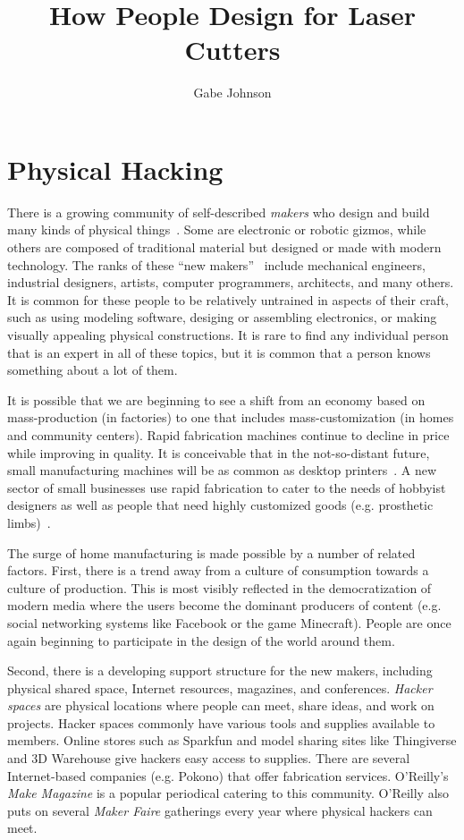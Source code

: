 \documentclass[12pt]{article}
\title{How People Design for Laser Cutters}
\author{Gabe Johnson}
\begin{document}
\maketitle

\section{Physical Hacking}

There is a growing community of self-described \textit{makers} who
design and build many kinds of physical
things~\cite{gershenfeld-fab}. Some are electronic or robotic gizmos,
while others are composed of traditional material but designed or made
with modern technology. The ranks of these ``new
makers''~\cite{gross-new-makers} include mechanical engineers,
industrial designers, artists, computer programmers, architects, and
many others. It is common for these people to be relatively untrained
in aspects of their craft, such as using modeling software, desiging
or assembling electronics, or making visually appealing physical
constructions. It is rare to find any individual person that is an
expert in all of these topics, but it is common that a person knows
something about a lot of them.

It is possible that we are beginning to see a shift from an economy
based on mass-production (in factories) to one that includes
mass-customization (in homes and community centers). Rapid fabrication
machines continue to decline in price while improving in quality. It
is conceivable that in the not-so-distant future, small manufacturing
machines will be as common as desktop printers~\cite{economist-fab}. A
new sector of small businesses use rapid fabrication to cater to the
needs of hobbyist designers as well as people that need highly
customized goods (e.g. prosthetic limbs)~\cite{nyt-rapidfab}.

The surge of home manufacturing is made possible by a number of
related factors. First, there is a trend away from a culture of
consumption towards a culture of production. This is most visibly
reflected in the democratization of modern media where the users
become the dominant producers of content (e.g. social networking
systems like Facebook or the game Minecraft). People are once again
beginning to participate in the design of the world around them.

Second, there is a developing support structure for the new makers,
including physical shared space, Internet resources, magazines, and
conferences. \textit{Hacker spaces} are physical locations where
people can meet, share ideas, and work on projects. Hacker spaces
commonly have various tools and supplies available to members. Online
stores such as Sparkfun and model sharing sites like Thingiverse and
3D Warehouse give hackers easy access to supplies. There are several
Internet-based companies (e.g. Pokono) that offer fabrication
services. O'Reilly's \textit{Make Magazine} is a popular periodical
catering to this community. O'Reilly also puts on several
\textit{Maker Faire} gatherings every year where physical hackers can
meet.
\end{document}
